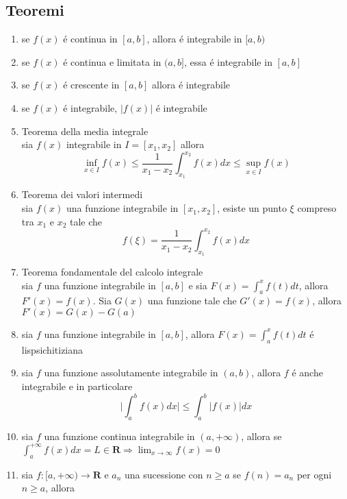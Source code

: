 \documentclass{exam}
\begin{document}
	\subsection{Teoremi}
		\begin{enumerate}
			\item
				se $f(x)$ \'e continua in $[a,b]$, allora \'e integrabile in $[a,b)$
			\item
				se $f(x)$ \'e continua e limitata in $(a,b]$, essa \'e integrabile in $[a,b]$
			\item
				se $f(x)$ \'e crescente in $[a,b]$ allora \'e integrabile
			\item 
				se $f(x)$ \'e integrabile, $|f(x)|$ \'e integrabile
			\item{Teorema della media integrale}\\
				sia $f(x)$ integrabile in $I=[x_1,x_2]$ allora 
				\begin{equation}
					\inf_{x\in I}f(x)\le\frac{1}{x_1-x_2}\int_{x_1}^{x_2} f(x)dx\le \sup_{x\in I}f(x)
				\end{equation}
			\item{Teorema dei valori intermedi}\\
				sia $f(x)$ una funzione integrabile in $[x_1,x_2]$, esiste un punto $\xi$ compreso tra $x_1$ e $x_2$ tale che 
				\begin{equation}
					f(\xi)=\frac{1}{x_1-x_2}\int_{x_1}^{x_2} f(x)dx
				\end{equation}
			\item{Teorema fondamentale del calcolo integrale}\\
				sia $f$ una funzione integrabile in $[a,b]$ e sia \(\displaystyle F(x)=\int_a^x f(t)dt \), allora $F'(x)=f(x)$.
				Sia $G(x)$ una funzione tale che $G'(x)=f(x)$, allora $F'(x)=G(x)-G(a)$
			\item
				sia $f$ una funzione integrabile in $[a,b]$, allora \(\displaystyle F(x)=\int_a^x f(t)dt \) \'e lispsichitiziana
			\item
				sia $f$ una funzione assolutamente integrabile in $(a,b)$, allora $f$ \'e anche integrabile e in particolare
				\begin{equation}
					\bigg|\int_a^b f(x)dx\bigg|\le \int_a^b|f(x)|dx
				\end{equation}
			\item
				sia $f$ una funzione continua integrabile in $(a,+\infty)$, allora se \(\displaystyle \int_a^{+\infty}f(x)dx=L\in\mathbf{R}\Rightarrow \lim_{x\to\infty}f(x)=0\) 
			\item
				sia $f:[a,+\infty)\rightarrow\mathbf{R}$ e $a_n$ una sucessione con $n\geq a$ se $f(n)=a_n$ per ogni $n\geq a$, allora

\end{enumerate}
\end{document}
